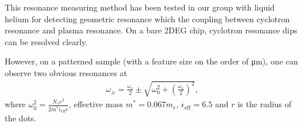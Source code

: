 \documentclass[12pt]{ruthesis}
\begin{document}
This resonance measuring method has been tested in our group with liquid helium for detecting geometric resonance which the coupling between cyclotron resonance and plasma resonance. 
On a bare 2DEG chip, cyclotron resonance dips can be resolved clearly.


However, on a patterned sample (with a feature size on the order of \si{\micro\meter}), one can observe two obvious resonances at
\begin{align}
\omega_{\pm}=\frac{\omega_{c}}{2} \pm \sqrt{ \omega_{0}^{2}+ \left(\frac{ \omega_{c} }{2}\right)^{2}},
\end{align}
where $\displaystyle \omega_{0}^{2}=\frac{N_{s}e^{2}}{2m^{\ast}\epsilon_{\mathrm{eff}}r}$, effective mass $m^{*}=0.067m_{e}$, $\epsilon_{\mathrm{eff}}=6.5$ and $r$ is the radius of the dots. 
\end{document}
